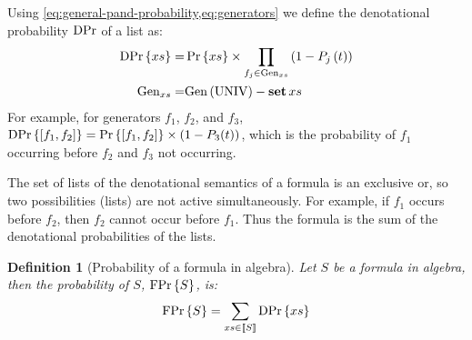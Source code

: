 \documentclass[12pt,openright,twoside,a4paper,oldfontcommands,english,brazil,final]{abntex2}
\newtheorem{definition}{Definition}[chapter]
\theoremstyle{theo}
\def\True{\ensuremath\operatorname{UNIV}}
\def\listsetop{\ensuremath\operatorname{\mathbf{set}}}
\newcommand{\listset}[1]{\ensuremath\listsetop #1}
\def\probabilityop{\ensuremath \Pr}
\newcommand{\probability}[1]{\ensuremath \probabilityop\left\{#1\right\}}
\def\denotationalprobop{\ensuremath\mathrm{DPr}}
\newcommand{\denotationalprob}[1]{\ensuremath \denotationalprobop\left\{#1\right\}}
\def\formulaprobop{\ensuremath\mathrm{FPr}}
\newcommand{\formulaprob}[1]{\ensuremath \formulaprobop\left\{#1\right\}}
\newcommand{\denote}[1]{\ensuremath\left[\!\left[#1\right]\!\right]}
\def\generators{\ensuremath\mathrm{Gen}}
\newcommand{\listsof}[2]{\ensuremath\mathrm{lists}\left(#1, #2\right)}
\begin{document}
Using \cref{eq:general-pand-probability,eq:generators} we define the denotational probability $\denotationalprobop$ of a list as:
\begin{align}
\denotationalprob{xs} = &
  \probability{xs} \times \prod_{f_j \in \generators_{xs}} \left(1-P_j\left(t\right)\right)\label{eq:denotational-probability}\\
\generators_{xs} = & \generators\left(\True\right) - \listset{xs}\nonumber
\end{align}
%
%
For example, for generators $f_1$, $f_2$, and $f_3$, $\denotationalprob{\left[f_1,f_2\right]} = \probability{\left[f_1,f_2\right]}\times\left(1-P_3(t)\right)$, which is the probability of $f_1$ occurring before $f_2$ and $f_3$ not occurring.

The set of lists of the denotational semantics of a formula is an exclusive or, so two possibilities (lists) are not active simultaneously.
For example, if $f_1$ occurs before $f_2$, then $f_2$ cannot occur before $f_1$.
Thus the formula is the sum of the denotational probabilities of the lists.

\begin{definition}[Probability of a formula in \ac{algebra}]
Let $S$ be a formula in \ac{algebra}, then the probability of $S$, $\formulaprob{S}$, is:
%
\begin{equation}
\label{eq:formula-probability}
\formulaprob{S} = \sum_{xs \in \denote{S}}\denotationalprob{xs}
\end{equation}
\end{definition}
\end{document}
